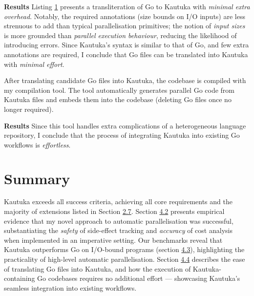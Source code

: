 \textbf{Results} Listing \hyperref[listing:translation]{1} presents a transliteration of Go to Kautuka with \textit{minimal extra overhead}. Notably, the required annotations (size bounds on I/O inputs) are less strenuous to add than typical parallelisation primitives; the notion of \textit{input sizes} is more grounded than \textit{parallel execution behaviour}, reducing the likelihood of introducing errors. Since Kautuka's syntax is similar to that of Go, and few extra annotations are required, I conclude that Go files can be translated into Kautuka with \textit{minimal effort}.

\newpage 

After translating candidate Go files into Kautuka, the codebase is compiled with my compilation tool. The tool automatically generates parallel Go code from Kautuka files and embeds them into the codebase (deleting Go files once no longer required).

\textbf{Results} Since this tool handles extra complications of a heterogeneous language repository, I conclude that the process of integrating Kautuka into existing Go workflows is \textit{effortless}.

\section{Summary}

\label{sec:4.5}


Kautuka exceeds all success criteria, achieving all core requirements and the majority of extensions listed in Section \hyperref[sec:2.7]{2.7}. Section \hyperref[sec:4.2]{4.2} presents empirical evidence that my novel approach to automatic parallelisation was successful, substantiating the \textit{safety} of side-effect tracking and \textit{accuracy} of cost analysis when implemented in an imperative setting. Our benchmarks reveal that Kautuka outperforms Go on I/O-bound programs (section \hyperref[sec:4.3]{4.3}), highlighting the practicality of high-level automatic parallelisation. Section \hyperref[sec:4.4]{4.4} describes the ease of translating Go files into Kautuka, and how the execution of Kautuka-containing Go codebases requires no additional effort --- showcasing Kautuka's seamless integration into existing workflows.
